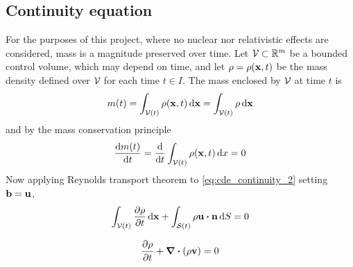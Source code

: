 
\subsection{Continuity equation}

For the purposes of this project, where no nuclear nor relativistic effects are considered, mass is a magnitude preserved over time. Let $\mathcal{V}_{} \subset \mathbb{R}^m$ be a bounded control volume, which may depend on time, and let $\rho = \rho(\vb{x}, t)$ be the mass density defined over $\mathcal{V}_{}$ for each time $t \in I$. The mass enclosed by $\mathcal{V}_{}$ at time $t$ is
\begin{equation} \label{eq:cde_continuity_1}
	m(t) = \int_{\mathcal{V}_{}(t)} \rho(\vb{x}, t) \dd{\vb{x}} = \int_{\mathcal{V}_{}(t)} \rho \dd{\vb{x}}
\end{equation}
and by the mass conservation principle
\begin{equation} \label{eq:cde_continuity_2}
	\frac{\dd m(t)}{\dd{t}} = 
	\frac{\dd}{\dd{t}} \int_{\mathcal{V}_{}(t)} \rho(\vb{x}, t) \dd{x} = 0
\end{equation}
Now applying Reynolds transport theorem to \eqref{eq:cde_continuity_2} setting $\vb{b} = \vb{u}$,
\begin{equation}
	\int_\cvt \frac{\partial \rho}{\partial t} \dd{\vb{x}} + 
	\int_\svt \rho \vb{u} \vdot \vb{n} \dd{S} = 0
\end{equation}

\begin{equation}
	\pdv{\rho}{t} + \div(\rho \vb{v}) = 0
\end{equation}

